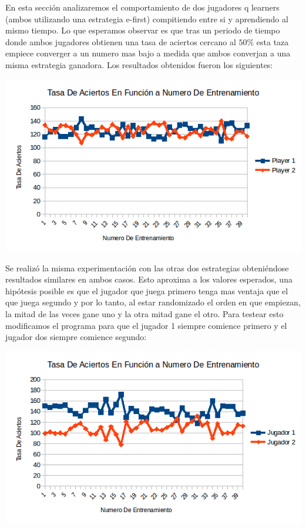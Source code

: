 En esta sección analizaremos el comportamiento de dos jugadores q learners (ambos utilizando una estrategia e-first) compitiendo entre si y aprendiendo al mismo tiempo. Lo que esperamos observar es que tras un periodo de tiempo donde ambos jugadores obtienen una tasa de aciertos cercano al $50 \%$ esta taza empiece converger a un numero mas bajo a medida que ambos converjan a una misma estrategia ganadora. Los resultados obtenidos fueron los siguientes:

\includegraphics[scale=0.5]{testing/qvsq.png}

Se realizó la misma experimentación con las otras dos estrategias obteniéndose resultados similares en ambos casos. Esto aproxima a los valores esperados, una hipótesis posible es que el jugador que juega primero tenga mas ventaja que el que juega segundo y por lo tanto, al estar randomizado el orden en que empiezan, la mitad de las veces gane uno y la otra mitad gane el otro. Para testear esto modificamos el programa para que el jugador 1 siempre comience primero y el jugador dos siempre comience segundo:

\includegraphics[scale=0.5]{testing/qvsq2.png}


